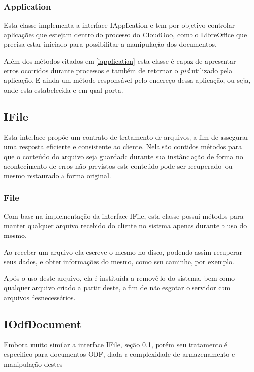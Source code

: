 \subsubsection{Application}
\label{application}

Esta classe implementa a interface IApplication e tem por objetivo controlar aplicações que estejam dentro do processo do CloudOoo, como o LibreOffice que precisa estar iniciado para possibilitar a manipulação dos documentos.

Além dos métodos citados em \ref{iapplication} esta classe é capaz de apresentar erros ocorridos durante processos e também de retornar o \textit{pid} utilizado pela aplicação. E ainda um método responsável pelo endereço dessa aplicação, ou seja, onde esta estabelecida e em qual porta.


\subsection{IFile}
\label{ifile}

Esta interface propõe um contrato de tratamento de arquivos, a fim de assegurar uma resposta eficiente e consistente ao cliente. Nela são contidos métodos para que o conteúdo do arquivo seja guardado durante sua instânciação de forma no acontecimento de erros não previstos este conteúdo pode ser recuperado, ou mesmo restaurado a forma original.


\subsubsection{File}
\label{file}

Com base na implementação da interface IFile, esta classe possui métodos para manter qualquer arquivo recebido do cliente no sistema apenas durante o uso do mesmo.

Ao receber um arquivo ela escreve o mesmo no disco, podendo assim recuperar seus dados, e obter informações do mesmo, como seu caminho, por exemplo.

Após o uso deste arquivo, ela é instituída a removê-lo do sistema, bem como qualquer arquivo criado a partir deste, a fim de não esgotar o servidor com arquivos desnecessários.


\subsection{IOdfDocument}

Embora muito similar a interface IFile, seção \ref{ifile}, porém seu tratamento é especifico para documentos ODF, dada a complexidade de armazenamento e manipulação destes.


